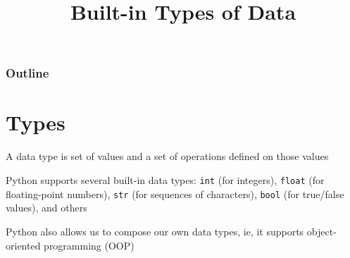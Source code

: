 \documentclass[8pt,a4paper,compress]{beamer}
\title{Built-in Types of Data}
\date{}
\begin{document}
\begin{frame}
\vfill
\titlepage
\end{frame}

\begin{frame}
\frametitle{Outline}
\tableofcontents
\end{frame}

\section{Types}
\begin{frame}[fragile]
\pause

A data type is set of values and a set of operations defined on those values

\pause
\bigskip

Python supports several built-in data types: \lstinline{int} (for integers), \lstinline{float} (for floating-point numbers), \lstinline{str} (for sequences of characters), \lstinline{bool} (for true/false values), and others

\pause
\bigskip

Python also allows us to compose our own data types, ie, it supports object-oriented programming (OOP)
\end{frame}
\end{document}
